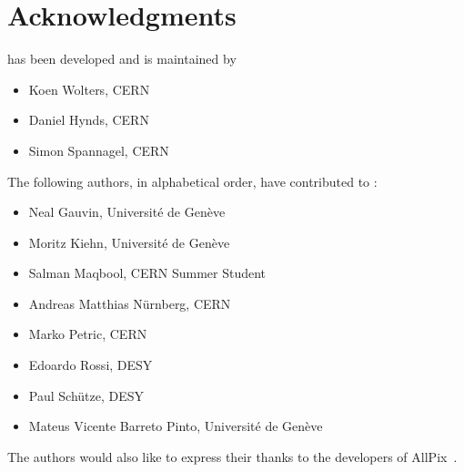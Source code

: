 \section{Acknowledgments}

\apsq has been developed and is maintained by

\begin{itemize}
\item Koen Wolters, CERN
\item Daniel Hynds, CERN
\item Simon Spannagel, CERN
\end{itemize}

The following authors, in alphabetical order, have contributed to \apsq:

\begin{itemize}
\item Neal Gauvin, Université de Genève
\item  Moritz Kiehn, Université de Genève
\item  Salman Maqbool, CERN Summer Student
\item  Andreas Matthias Nürnberg, CERN
\item  Marko Petric, CERN
\item  Edoardo Rossi, DESY
\item  Paul Schütze, DESY
\item  Mateus Vicente Barreto Pinto, Université de Genève
\end{itemize}

The authors would also like to express their thanks to the developers of AllPix~\cite{ap1wiki,ap1git}.
